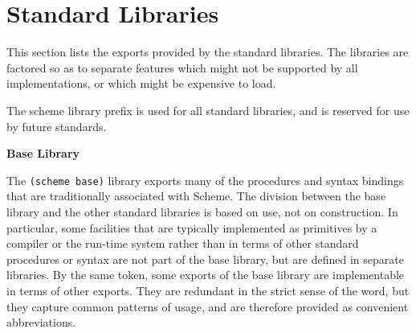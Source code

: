 \chapter{Standard Libraries}
\label{stdlibraries}


This section lists the exports provided by the standard libraries.  The
libraries are factored so as to separate features which might not be
supported by all implementations, or which might be expensive to load.

The {\cf scheme} library prefix is used for all standard libraries, and
is reserved for use by future standards.

\textbf{Base Library}

The \texttt{(scheme base)} library exports many of the procedures and
syntax bindings that are traditionally associated with Scheme.
The division between the base library and the other standard libraries is
based on use, not on construction. In particular, some facilities that are
typically implemented as primitives by a compiler or the run-time system
rather than in terms of other standard procedures or syntax are
not part of the base library, but are defined in separate libraries.
By the same token, some exports of the base library are implementable
in terms of other exports.  They are redundant in the strict sense of
the word, but they capture common patterns of usage, and are therefore
provided as convenient abbreviations.

